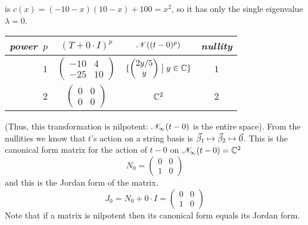 \begin{exercises}
\begin{answer}
\begin{exparts}
           is $c(x)=(-10-x)(10-x)+100=x^2$, 
           so it has only the single eigenvalue $\lambda=0$.
           \begin{center}
             \renewcommand{\arraystretch}{1.25}
             \begin{tabular}{r|ccc}
                \textit{power}~$p$ &$(T+0\cdot I)^p$ &$\mathscr{N}((t-0)^p)$
                    &\textit{nullity}                   \\ 
                \hline
                $1$  
                &$\begin{pmatrix}
                  -10  &4  \\ 
                  -25  &10
                \end{pmatrix}$
                &$\mbox{$\{\begin{pmatrix} 2y/5 \\ y \end{pmatrix}\bigm|
                                     y\in\mathbb{C}\}$}$
                &$1$                                       \\
                $2$  
                &$\begin{pmatrix}
                    0  &0  \\ 
                    0  &0
                \end{pmatrix}$
                &$\mathbb{C}^2$
                &$2$
             \end{tabular}
           \end{center}
           (Thus, this transformation is nilpotent: 
           $\mathscr{N}_\infty(t-0)$ is the entire space).
           From the nullities we know that $t$'s
           action on a string basis is 
           $\vec{\beta}_1\mapsto\vec{\beta}_2\mapsto\vec{0}$.
           This is the canonical form matrix for the action of $t-0$ on
           $\mathscr{N}_\infty(t-0)=\mathbb{C}^2$
           \begin{equation*}
             N_0=
             \begin{pmatrix}
               0  &0  \\
               1  &0
            \end{pmatrix}
           \end{equation*}
           and this is the Jordan form of the matrix.
           \begin{equation*}
             J_0=N_0+0\cdot I=
             \begin{pmatrix}
               0  &0  \\
               1  &0
            \end{pmatrix}
           \end{equation*}
           Note that if a matrix is nilpotent then its canonical form
           equals its Jordan form.


\end{exparts}
\end{answer}
\end{exercises}
